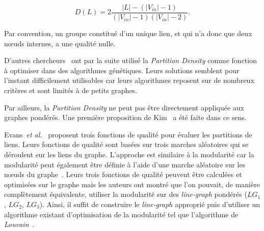 \begin{equation}
 D(L) = 2 \dfrac{|L| - (|V_{in}|-1) }{(|V_{in}|-1) (|V_{in}|-2)}.
\end{equation}

Par convention, un groupe constitué d'un unique lien, et qui n'a donc que deux n\oe{}uds internes, a une qualité nulle.

D'autres chercheurs~\cite{Li2013,Shi2013} ont par la suite utilisé la \emph{Partition Density} comme fonction à optimiser dans des algorithmes génétiques.
Leurs solutions semblent pour l'instant difficilement utilisables car leurs algorithmes reposent sur de nombreux critères et sont limités à de petits graphes.

Par ailleurs, la \emph{Partition Density} ne peut pas être directement appliquée aux graphes pondérés.
Une première proposition de Kim~\cite{Kim2014a} a été faite dans ce sens.




Evans~\emph{et al.}~\cite{Evans2009} proposent trois fonctions de qualité pour évaluer les partitions de liens.
Leurs fonctions de qualité sont basées sur trois marches aléatoires qui se déroulent sur les liens du graphe.
L'approche est similaire à la modularité car la modularité peut également être définie à l'aide d'une marche aléatoire sur les n\oe{}uds du graphe~\cite{Delvenne2010}.
Leurs trois fonctions de qualité peuvent être calculées et optimisées sur le graphe mais les auteurs ont montré que l'on pouvait, de manière complètement équivalente, utiliser la modularité sur des \emph{line-graph} pondérés ($LG_1$, $LG_2$, $LG_3$).
Ainsi, il suffit de construire le \emph{line-graph} approprié puis d'utiliser un algorithme existant d'optimisation de la modularité tel que l'algorithme de \emph{Louvain}~\cite{Blondel2008a}.


